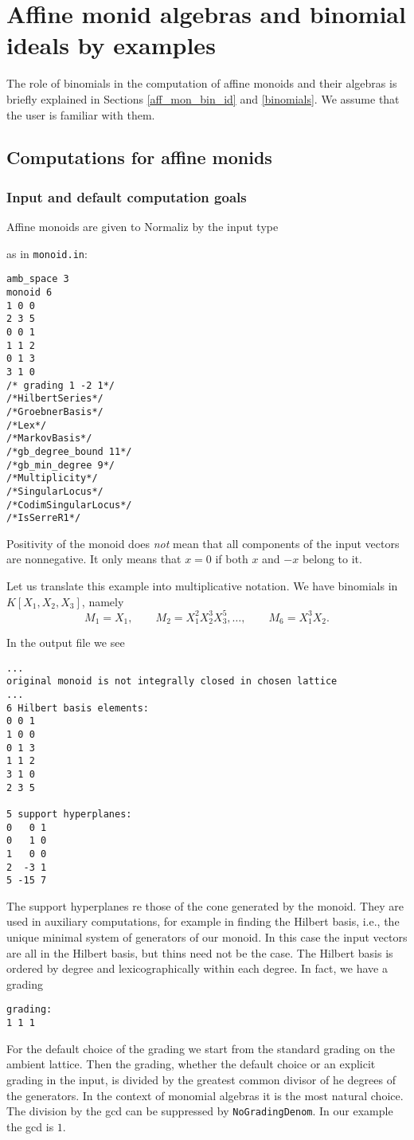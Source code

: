 \section{Affine monid algebras and binomial ideals by examples}\label{AffMon}

The role of binomials in the computation of affine monoids and their algebras is briefly explained in Sections \ref{aff_mon_bin_id} and \ref{binomials}. We assume that the user is familiar with them.

\subsection{Computations for affine monids}

\subsubsection{Input and default computation goals}\label{moninp_def}
Affine monoids are given to Normaliz by the input type 
\begin{itemize}
	\itemtt[monoid]
\end{itemize}
as in \verb|monoid.in|:
\begin{Verbatim}
amb_space 3
monoid 6
1 0 0
2 3 5
0 0 1
1 1 2
0 1 3
3 1 0
/* grading 1 -2 1*/
/*HilbertSeries*/
/*GroebnerBasis*/
/*Lex*/
/*MarkovBasis*/
/*gb_degree_bound 11*/
/*gb_min_degree 9*/
/*Multiplicity*/
/*SingularLocus*/
/*CodimSingularLocus*/
/*IsSerreR1*/
\end{Verbatim}
Positivity of the monoid does \emph{not} mean that all components of the input vectors are nonnegative. It only means that $x=0$ if both $x$ and $-x$ belong to it.

Let us translate this example into multiplicative notation. We have binomials in $K[X_1,X_2,X_3]$, namely 
$$
M_1 = X_1,\qquad M_2 = X_1^2X_2^3X_3^5,\dots, \qquad M_6 =X_1^3X_2.
$$

In the output file we see
\begin{Verbatim}
...
original monoid is not integrally closed in chosen lattice
...
6 Hilbert basis elements:
0 0 1
1 0 0
0 1 3
1 1 2
3 1 0
2 3 5

5 support hyperplanes:
0   0 1
0   1 0
1   0 0
2  -3 1
5 -15 7
\end{Verbatim}
The support hyperplanes re those of the cone generated by the monoid. They are used in auxiliary computations, for example in finding the Hilbert basis, i.e., the unique minimal system of generators of our monoid. In this case the input vectors are all in the Hilbert basis, but thins need not be the case. The Hilbert basis is ordered by degree and lexicographically within each degree. In fact, we have a grading
\begin{Verbatim}
grading:
1 1 1 
\end{Verbatim}
For the default choice of the grading we start from the standard grading on the ambient lattice. Then the grading, whether the default choice or an explicit grading in the input, is divided by the greatest common divisor of he degrees of the generators. In the context of monomial algebras it is the most natural choice. The division by the gcd can be suppressed by \verb|NoGradingDenom|. In our example the gcd is $1$.

